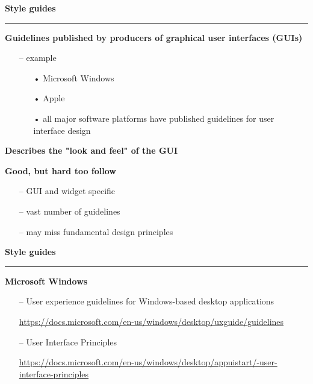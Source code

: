 \documentclass[pdf]{beamer}
\begin{document}
\begin{frame}
{\textbf{Style guides}}{\textcolor{red}{\rule{12cm}{1.2pt}}}
   
  	\textbf{Guidelines published by producers of graphical user interfaces (GUIs)}
	\begin{itemize}
		\item[--] {example}
		\begin{itemize}
            \item[{•}] {Microsoft Windows}
            \item[{•}] {Apple}
            \item[{•}] all major software platforms have published guidelines for user interface design
        \end{itemize}
    \end{itemize}

    \textbf{Describes the "look and feel" of the GUI}

    \textbf{Good, but hard too follow}
	\begin{itemize}
		\item[--] {GUI and widget specific}
		\item[--] {vast number of guidelines}
        \item[--] {may miss fundamental design principles}
    \end{itemize}
\end{frame}



\begin{frame}
{\textbf{Style guides}}{\textcolor{red}{\rule{12cm}{1.2pt}}}
   
  	\textbf{Microsoft Windows}
	\begin{itemize}
		\item[--] User experience guidelines for Windows-based desktop applications
		
		\url{https://docs.microsoft.com/en-us/windows/desktop/uxguide/guidelines}

		\item[--] User Interface Principles
				
		\url{https://docs.microsoft.com/en-us/windows/desktop/appuistart/-user-interface-principles}
    \end{itemize}

\end{frame}
\end{document}
